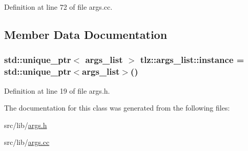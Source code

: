 Definition at line 72 of file args.\+cc.



\subsection{Member Data Documentation}
\subsubsection[{\texorpdfstring{instance}{instance}}]{\setlength{\rightskip}{0pt plus 5cm}std\+::unique\+\_\+ptr$<$ {\bf args\+\_\+list} $>$ tlz\+::args\+\_\+list\+::instance = std\+::unique\+\_\+ptr$<${\bf args\+\_\+list}$>$()\hspace{0.3cm}{\ttfamily [static]}}\hypertarget{classtlz_1_1args__list_a0617ca3169bfad6933b84514c4fee4ea}{}\label{classtlz_1_1args__list_a0617ca3169bfad6933b84514c4fee4ea}


Definition at line 19 of file args.\+h.



The documentation for this class was generated from the following files\+:\begin{DoxyCompactItemize}
\item 
src/lib/\hyperlink{args_8h}{args.\+h}\item 
src/lib/\hyperlink{args_8cc}{args.\+cc}\end{DoxyCompactItemize}
